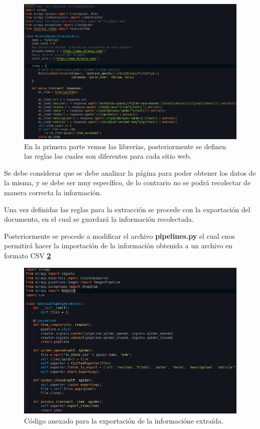 \begin{figure}[H]
  \centering
  \includegraphics[scale=.45]{imagenes/Capitulo5/6}
  \caption{En la primera parte vemos las librerias, posteriormente se definen las reglas las cuales son diferentes para cada sitio web.}
  \label{fig:seis}
\end{figure}

Se debe considerar que se debe analizar la página para poder obtener los datos de la misma, y se debe ser muy específico, de lo contrario 
no se podrá recolectar de manera correcta la información.

Una vez definidas las reglas para la extracción se procede con la exportación del documento, en el cual se guardará la información recolectada.

Posteriormente se procede a modificar el archivo \textbf{pipelines.py} el cual cnos permitirá hacer la importación de la información obtenida a un 
archivo en formato CSV \textbf{\ref{fig:siete}}

\begin{figure}[H]
  \centering
  \includegraphics[scale=.45]{imagenes/Capitulo5/7}
  \caption{Código anexado para la exportación de la informacióne extraída.}
  \label{fig:siete}
\end{figure}

